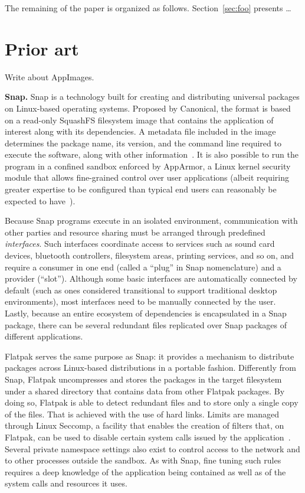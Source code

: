 \documentclass[sigplan, anonymous, 10pt]{acmart}
\begin{document}
The remaining of the paper is organized as follows. Section~\ref{sec:foo} presents \ldots

\section{Prior art}

Write about AppImages.

\textbf{Snap.}
Snap is a technology built for creating and distributing universal packages on Linux-based
operating systems. Proposed by Canonical, the format is based on a read-only SquashFS filesystem
image that contains the application of interest along with its dependencies. A metadata file
included in the image determines the package name, its version, and the command line required
to execute the software, along with other information~\cite{canonical2011:snapcraft}.
It is also possible to run the program in a confined sandbox enforced by AppArmor, a Linux kernel
security module that allows fine-grained control over user applications (albeit requiring greater
expertise to be configured than typical end users can reasonably be expected to
have~\cite{schreuders2011:empowering}).

Because Snap programs execute in an isolated environment, communication with other parties
and resource sharing must be arranged through predefined \emph{interfaces}. Such interfaces
coordinate access to services such as sound card devices, bluetooth controllers, filesystem
areas, printing services, and so on, and require a consumer in one end (called a ``plug''
in Snap nomenclature) and a provider (``slot''). Although some basic interfaces are automatically
connected by default (such as ones considered transitional to support traditional desktop
environments), most interfaces need to be manually connected by the user. Lastly, because
an entire ecosystem of dependencies is encapsulated in a Snap package, there can be several
redundant files replicated over Snap packages of different applications.

Flatpak serves the same purpose as Snap: it provides a mechanism to distribute packages
across Linux-based distributions in a portable fashion. Differently from Snap, Flatpak
uncompresses and stores the packages in the target filesystem under a shared directory
that contains data from other Flatpak packages. By doing so, Flatpak is able to detect
redundant files and to store only a single copy of the files. That is achieved with the
use of hard links. Limits are managed through Linux Seccomp, a facility that enables
the creation of filters that, on Flatpak, can be used to disable certain system calls
issued by the application~\cite{lwn2015:seccomp}. Several private namespace settings
also exist to control access to the network and to other processes outside the sandbox.
As with Snap, fine tuning such rules requires a deep knowledge of the application being
contained as well as of the system calls and resources it uses.
\end{document}
